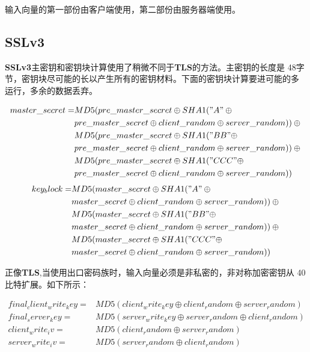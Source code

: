 \documentclass[11pt,dvips]{article}
\newcommand{\bfs}[1]{{\bf{#1}}}
\begin{document}
输入向量的第一部份由客户端使用，第二部份由服务器端使用。

\subsection{SSLv3}

\bfs{SSLv3}主密钥和密钥块计算使用了稍微不同于\bfs{TLS}的方法。主密钥的长度是
48字节，密钥块尽可能的长以产生所有的密钥材料。下面的密钥块计算要进可能的多
运行，多余的数据丢弃。

\begin{align*}
        master\_secret = &MD5(pre\_master\_secret \oplus SHA1("A" \oplus {} \\
                        &pre\_master\_secret  \oplus client\_random \oplus server\_random)) \oplus  {} \\
                        &MD5(pre\_master\_secret \oplus SHA1("BB" \oplus\\ {}
        &pre\_master\_secret \oplus client\_random \oplus
        server\_random))\oplus {} \\
        &MD5(pre\_master\_secret \oplus SHA1("CCC" \oplus \\
        &pre\_master\_secret \oplus client\_random \oplus server\_random))
\end{align*}
\begin{align*}
        key_block = &MD5(master\_secret \oplus SHA1("A" \oplus {} \\
                        &master\_secret  \oplus client\_random \oplus server\_random)) \oplus  {} \\
                        &MD5(master\_secret \oplus SHA1("BB" \oplus\\ {}
        &master\_secret \oplus client\_random \oplus
        server\_random))\oplus {} \\
        &MD5(master\_secret \oplus SHA1("CCC" \oplus \\
        &master\_secret \oplus client\_random \oplus server\_random))
\end{align*}


正像\bfs{TLS},当使用出口密码族时，输入向量必须是非私密的，非对称加密密钥从
40比特扩展。如下所示：

\begin{align*}
        final_client_write_key = & MD5(client_write_key \oplus client_random
        \oplus server_random) {} \\
        final_server_key  = & MD5(server_write_key \oplus server_random \oplus
        client_random) {} \\
        client_write_iv = &MD5(client_random \oplus server_random) {} \\
        server_write_iv = & MD5(server_random \oplus client_random)
\end{align*}
\end{document}
